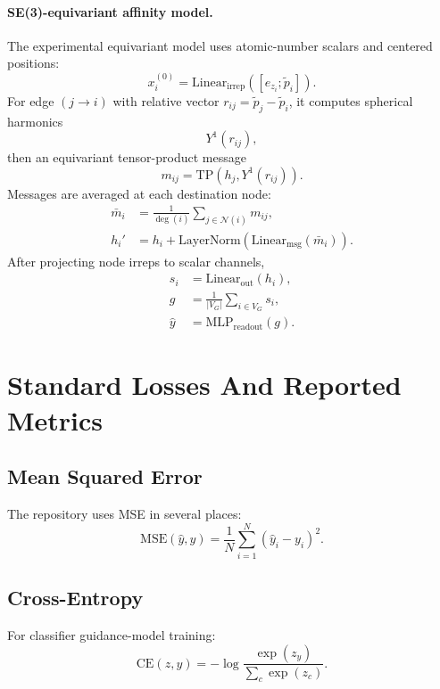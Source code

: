 \documentclass[11pt]{article}
\begin{document}
\paragraph{SE(3)-equivariant affinity model.}
The experimental equivariant model uses atomic-number scalars and centered positions:
\begin{equation}
x_i^{(0)} = \mathrm{Linear}_{\mathrm{irrep}}([e_{z_i}; \tilde{p}_i]).
\end{equation}
For edge $(j \to i)$ with relative vector $r_{ij} = \tilde{p}_j - \tilde{p}_i$, it computes spherical harmonics
\begin{equation}
Y^1(r_{ij}),
\end{equation}
then an equivariant tensor-product message
\begin{equation}
m_{ij} = \mathrm{TP}(h_j, Y^1(r_{ij})).
\end{equation}
Messages are averaged at each destination node:
\begin{align}
\bar{m}_i &= \frac{1}{\deg(i)}\sum_{j \in \mathcal{N}(i)} m_{ij}, \\
h_i' &= h_i + \mathrm{LayerNorm}\!\left(\mathrm{Linear}_{\mathrm{msg}}(\bar{m}_i)\right).
\end{align}
After projecting node irreps to scalar channels,
\begin{align}
s_i &= \mathrm{Linear}_{\mathrm{out}}(h_i), \\
g &= \frac{1}{|V_G|}\sum_{i \in V_G} s_i, \\
\hat{y} &= \mathrm{MLP}_{\mathrm{readout}}(g).
\end{align}

\section{Standard Losses And Reported Metrics}
\subsection{Mean Squared Error}
The repository uses MSE in several places:
\begin{equation}
\mathrm{MSE}(\hat{y},y)
=
\frac{1}{N}\sum_{i=1}^N (\hat{y}_i - y_i)^2.
\end{equation}

\subsection{Cross-Entropy}
For classifier guidance-model training:
\begin{equation}
\mathrm{CE}(z,y)
=
-\log
\frac{\exp(z_y)}{\sum_c \exp(z_c)}.
\end{equation}
\end{document}
